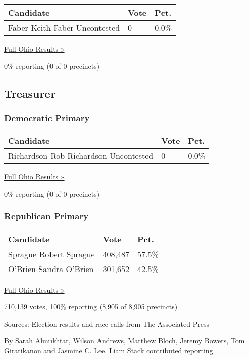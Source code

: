 \begin{longtable}[]{@{}lll@{}}
\toprule
Candidate & Vote & Pct.\tabularnewline
\midrule
\endhead
 Faber Keith Faber Uncontested & 0 & 0.0\%\tabularnewline
\bottomrule
\end{longtable}

\href{https://www.nytimes3xbfgragh.onion/elections/results/ohio}{Full
Ohio Results »}

0\% reporting (0 of 0 precincts)

\hypertarget{treasurer}{%
\subsection{Treasurer}\label{treasurer}}

\hypertarget{democratic-primary-21}{%
\subsubsection{Democratic Primary}\label{democratic-primary-21}}

\begin{longtable}[]{@{}lll@{}}
\toprule
Candidate & Vote & Pct.\tabularnewline
\midrule
\endhead
 Richardson Rob Richardson Uncontested & 0 & 0.0\%\tabularnewline
\bottomrule
\end{longtable}

\href{https://www.nytimes3xbfgragh.onion/elections/results/ohio}{Full
Ohio Results »}

0\% reporting (0 of 0 precincts)

\hypertarget{republican-primary-21}{%
\subsubsection{Republican Primary}\label{republican-primary-21}}

\begin{longtable}[]{@{}llll@{}}
\toprule
Candidate & Vote & Pct. &\tabularnewline
\midrule
\endhead
 Sprague Robert Sprague & 408,487 & 57.5\% &\tabularnewline
 O'Brien Sandra O'Brien & 301,652 & 42.5\% &\tabularnewline
\bottomrule
\end{longtable}

\href{https://www.nytimes3xbfgragh.onion/elections/results/ohio}{Full
Ohio Results »}

710,139 votes, 100\% reporting (8,905 of 8,905 precincts)

Sources: Election results and race calls from The Associated Press

By Sarah Almukhtar, Wilson Andrews, Matthew Bloch, Jeremy Bowers, Tom
Giratikanon and Jasmine C. Lee. Liam Stack contributed reporting.

